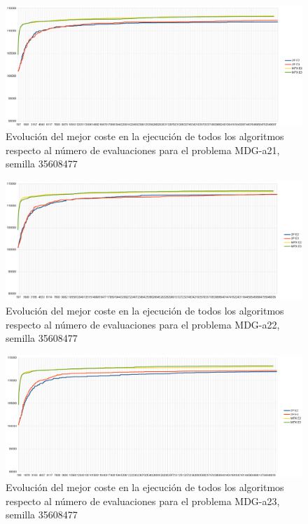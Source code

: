 	\begin{figure}[H]
		\centering
		\includegraphics[scale=0.3]{img/35608477_MDG-a_21_n2000_m200.png}
		\caption{Evolución del mejor coste en la ejecución de todos los algoritmos respecto al número de evaluaciones para el problema MDG-a21, semilla 35608477}
		\label{MDG-a_21_historico}
	\end{figure}
	
	\begin{figure}[H]
		\centering
		\includegraphics[scale=0.3]{img/35608477_MDG-a_22_n2000_m200.png}
		\caption{Evolución del mejor coste en la ejecución de todos los algoritmos respecto al número de evaluaciones para el problema MDG-a22, semilla 35608477}
		\label{MDG-a_22_historico}
	\end{figure}

	\begin{figure}[H]
		\centering
		\includegraphics[scale=0.3]{img/35608477_MDG-a_23_n2000_m200.png}
		\caption{Evolución del mejor coste en la ejecución de todos los algoritmos respecto al número de evaluaciones para el problema MDG-a23, semilla 35608477}
		\label{MDG-a_23_historico}
	\end{figure}
			

